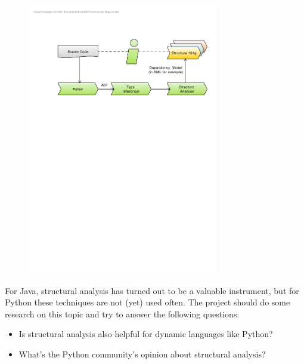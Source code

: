 \documentclass[12pt,halfparskip]{scrartcl}
\begin{document}
\begin{figure}[h] \centering
\includegraphics[width=0.75\textwidth]{big_picture}
\end{figure}

\vspace{0.3cm}

For Java, structural analysis has turned out to be a valuable instrument, but for Python these techniques are not (yet) used often. The project should do some research on this topic and try to answer the following questions:

\begin{itemize}
	\item Is structural analysis also helpful for dynamic languages like Python?
	\item What's the Python community's opinion about structural analysis?
\end{itemize}
\end{document}
